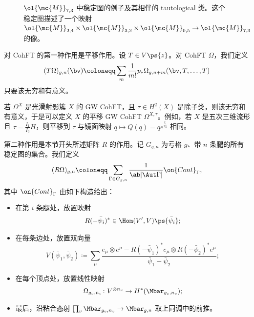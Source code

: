 \begin{figure}[htpb]
  \centering
  \caption{$\ol{\mc{M}}_{7,3}$ 中稳定图的例子及其相伴的 tautological 类。这个稳定图描述了一个映射
    $\ol{\mc{M}}_{2,4} \times \ol{\mc{M}}_{3,2} \times \ol{\mc{M}}_{0,5} \to \ol{\mc{M}}_{7,3}$ 的像。}
  \label{fig:stablegraph}
\end{figure}

对 CohFT 的第一种作用是平移作用。设 $T \in V\ps{z}$。对 CohFT $\Omega$，我们定义
\[ (T\Omega)_{g,n}(\bv) \coloneqq \sum_m \frac{1}{m!} p_* \Omega_{g,n+m}(\bv, T,\ldots,T) \]
只要该无穷和有意义。

\begin{exm}
    若 $\Omega^X$ 是光滑射影簇 $X$ 的 GW CohFT，且 $\tau \in H^2(X)$ 是除子类，则该无穷和有意义，于是可以定义 $X$ 的平移 GW CohFT $\Omega^{X,\tau}$。例如，若 $X$ 是五次三维流形且 $\tau = \frac{I_1}{I_0} H$，则平移到 $\tau$ 与镜面映射 $q \mapsto Q(q) = q e^{\frac{I_1}{I_0}}$ 相同。
\end{exm}

第二种作用是本节开头所述矩阵 $R$ 的作用。记 $G_{g,n}$ 为亏格 $g$、带 $n$ 条腿的所有稳定图的集合。我们定义
\[ (R\Omega)_{g,n} \coloneqq \sum_{\Gamma \in G_{g,n}} \frac{1}{\ab|\Aut \Gamma|} \on{Cont}_{\Gamma}, \]
其中 $\on{Cont}_{\Gamma}$ 由如下构造给出：
\begin{itemize}
    \item 在第 $i$ 条腿处，放置映射
        \[ R(-\bar{\psi}_i)^* \in \Hom(V',V) \ps{\bar{\psi}_i}; \]
    \item 在每条边处，放置双向量
        \[ V(\bar{\psi}_1, \bar{\psi}_2) \coloneqq \sum_{\mu} \frac{e_{\mu} \otimes e^{\mu} - R(-\bar{\psi}_1)^* e_{\mu} \otimes R(-\bar{\psi}_2)^* e^{\mu}}{\bar{\psi}_1 + \bar{\psi}_2}; \]
    \item 在每个顶点处，放置线性映射
        \[ \Omega_{g_v, n_v} \colon V^{\otimes n_v} \to H^*(\Mbar_{g_v, n_v}); \]
    \item 最后，沿粘合态射 $\prod_v \Mbar_{g_v, n_v} \to \Mbar_{g,n}$ 取上同调中的前推。
\end{itemize}


